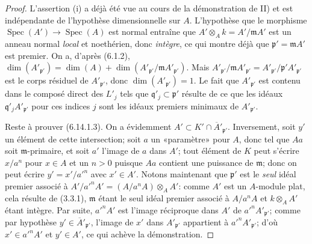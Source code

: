 \begin{proof}
L'assertion (i) a déjà été vue au cours de la démonstration de II) et est
indépendante de l'hypothèse dimensionnelle sur $A$. L'hypothèse que le
morphisme $\operatorname{Spec}(A')\to\operatorname{Spec}(A)$ est normal
entraîne que $A'\otimes_A k=A'/\mathfrak mA'$ est un anneau normal \emph{local} et
noethérien, donc \emph{intègre}, ce qui montre déjà que
$\mathfrak p'=\mathfrak mA'$ est premier. On a, d'après (6.1.2),
$\dim(A'_{\mathfrak p'})=\dim(A)+
\dim(A'_{\mathfrak p'}/\mathfrak mA'_{\mathfrak p'})$. Mais
$A'_{\mathfrak p'}/\mathfrak mA'_{\mathfrak p'}=
A'_{\mathfrak p'}/\mathfrak p'A'_{\mathfrak p'}$ est le corps résiduel de
$A'_{\mathfrak p'}$, donc $\dim(A'_{\mathfrak p'})=1$. Le fait que
$A'_{\mathfrak p'}$ est contenu dans le composé direct des $L'_j$ tels que
$\mathfrak q'_j\subset\mathfrak p'$ résulte de ce que les idéaux
$\mathfrak q'_jA'_{\mathfrak p'}$ pour ces indices $j$ sont les idéaux
premiers minimaux de $A'_{\mathfrak p'}$.

Reste à prouver (6.14.1.3). On a évidemment
$A'\subset K'\cap\overline{A}'_{\mathfrak p'}$. Inversement, soit $y'$ un
élément de cette intersection; soit $a$ un «paramètre» pour $A$, donc tel
que $Aa$ soit $\mathfrak m$-primaire, et soit $a'$ l'image de $a$ dans
$A'$; tout élément de $K$ peut s'écrire $x/a^n$ pour $x\in A$ et un $n>0$
puisque $Aa$ contient une puissance de $\mathfrak m$; donc on peut écrire
$y'=x'/a'^n$ avec $x'\in A'$. Notons maintenant que $\mathfrak p'$ est le
\emph{seul} idéal premier associé à
$A'/a'^nA'=(A/a^nA)\otimes_A A'$: comme $A'$ est un $A$-module plat, cela
résulte de (3.3.1), $\mathfrak m$ étant le seul idéal premier associé à
$A/a^nA$ et $k\otimes_A A'$ étant intègre. Par suite, $a'^nA'$ est l'image
réciproque dans $A'$ de $a'^nA'_{\mathfrak p'}$; comme par hypothèse
$y'\in\overline{A}'_{\mathfrak p'}$, l'image de $x'$ dans
$A'_{\mathfrak p'}$ appartient à $a'^nA'_{\mathfrak p'}$; d'où
$x'\in a'^nA'$ et $y'\in A'$, ce qui achève la démonstration.


\end{proof}
